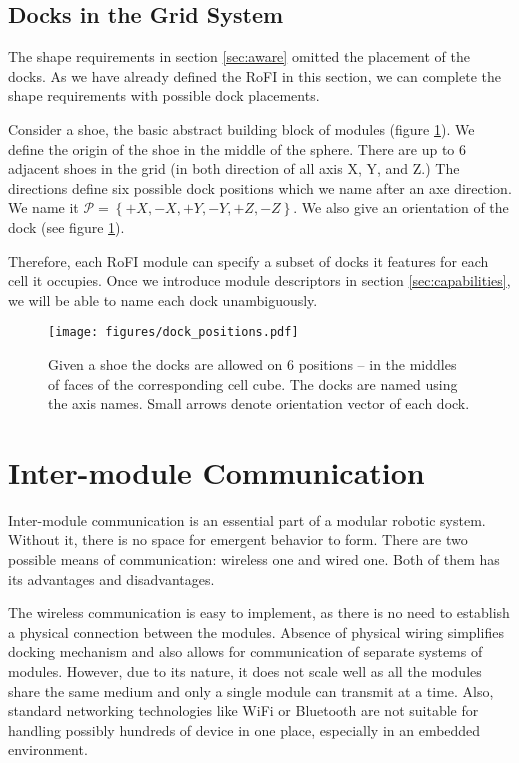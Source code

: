 \subsection{Docks in the Grid System}\label{sec:dock_in_grid}

The shape requirements in section \ref{sec:aware} omitted the placement of the
docks. As we have already defined the RoFI in this section, we can complete the
shape requirements with possible dock placements.

Consider a shoe, the basic abstract building block of modules (figure
\ref{fig:dock_positions}). We define the origin of the shoe in the middle of the
sphere. There are up to 6 adjacent shoes in the grid (in both direction of all
axis X, Y, and Z.) The directions define six possible dock positions which we
name after an axe direction. We name it $\mathcal{P} = \left\{+X, -X, +Y, -Y,
+Z, -Z\right\}$. We also give an orientation of the dock (see figure
\ref{fig:dock_positions}).

Therefore, each RoFI module can specify a subset of docks it features for each
cell it occupies. Once we introduce module descriptors in section
\ref{sec:capabilities}, we will be able to name each dock unambiguously.

\begin{figure}[t]
    \centering
    \texttt{[image: figures/dock\_positions.pdf]}
    \caption{Given a shoe the docks are allowed on 6 positions -- in the
    middles of faces of the corresponding cell cube. The docks are named using
    the axis names. Small arrows denote orientation vector of each dock.}
    \label{fig:dock_positions}
\end{figure}

\section{Inter-module Communication}\label{sec:communication}

Inter-module communication is an essential part of a modular robotic system.
Without it, there is no space for emergent behavior to form. There are two
possible means of communication: wireless one and wired one. Both of them
has its advantages and disadvantages.

The wireless communication is easy to implement, as there is no need to
establish a physical connection between the modules. Absence of physical wiring
simplifies docking mechanism and also allows for communication of separate
systems of modules. However, due to its nature, it does not scale well as all
the modules share the same medium and only a single module can transmit at a
time. Also, standard networking technologies like WiFi or Bluetooth are not
suitable for handling possibly hundreds of device in one place, especially in
an embedded environment.

